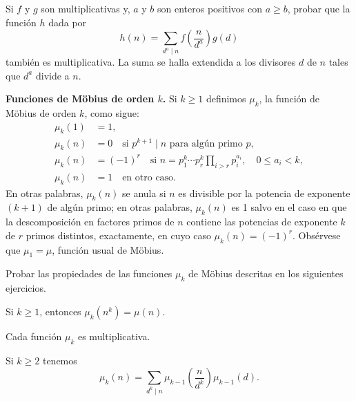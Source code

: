 \documentclass[12pt,a4paper]{book}
\begin{document}
    \begin{ejercicio}
        Si $f$ y $g$ son multiplicativas y, $a$ y $b$ son enteros positivos con $a\geq b$,
        probar que la función $h$ dada por
        \begin{equation*}
            h(n)=\sum_{d^{a}\mid n}f\left(\frac{n}{d^{a}}\right)g(d)
        \end{equation*}
        también es multiplicativa. La suma se halla extendida a los divisores $d$ de $n$
        tales que $d^{a}$ divide a $n$.
    \end{ejercicio}

    \textbf{Funciones de Möbius de orden $k$.} Si $k\geq1$ definimos $\mu_{k}$, la función de
    Möbius de orden $k$, como sigue:
    \begin{align*}
        \mu_{k}(1)&=1,\\
        \mu_{k}(n)&=0 \quad\text{si } p^{k+1}\mid n \text{ para algún primo } p,\\
        \mu_{k}(n)&=(-1)^{r} \quad\text{si } n=p_{1}^{k}\cdots p_{r}^{k}\prod_{i>r}p_{i}^{a_{i}},\quad
        0\leq a_{i}<k,\\
        \mu_{k}(n)&=1 \quad\text{en otro caso.}
    \end{align*}
    En otras palabras, $\mu_{k}(n)$ se anula si $n$ es divisible por la potencia de exponente
    $(k+1)$ de algún primo; en otras palabras, $\mu_{k}(n)$ es 1 salvo en el caso en que la
    descomposición en factores primos de $n$ contiene las potencias de exponente $k$ de $r$
    primos distintos, exactamente, en cuyo caso $\mu_{k}(n)=(-1)^{r}$. Obsérvese que
    $\mu_{1}=\mu$, función usual de Möbius.

    Probar las propiedades de las funciones $\mu_{k}$ de Möbius descritas en los siguientes
    ejercicios.

    \begin{ejercicio}
        Si $k\geq1$, entonces $\mu_{k}(n^{k})=\mu(n)$.
    \end{ejercicio}

    \begin{ejercicio}
        Cada función $\mu_{k}$ es multiplicativa.
    \end{ejercicio}

    \begin{ejercicio}
        Si $k\geq2$ tenemos
        \begin{equation*}
            \mu_{k}(n)=\sum_{d^{k}\mid n}\mu_{k-1}\left(\frac{n}{d^{k}}\right)\mu_{k-1}(d).
        \end{equation*}
    \end{ejercicio}
\end{document}
